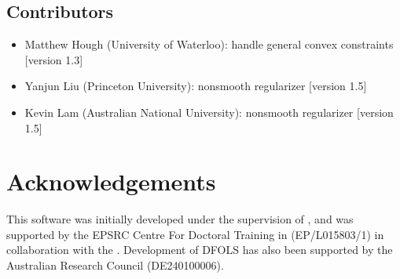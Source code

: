 \documentclass[letterpaper,10pt,english]{sphinxmanual}
\begin{document}
\section{Contributors}
\label{\detokenize{contributors:id1}}\begin{itemize}
\item {} 
\sphinxAtStartPar
Matthew Hough (University of Waterloo): handle general convex constraints {[}version 1.3{]}

\item {} 
\sphinxAtStartPar
Yanjun Liu (Princeton University): nonsmooth regularizer {[}version 1.5{]}

\item {} 
\sphinxAtStartPar
Kevin Lam (Australian National University): nonsmooth regularizer {[}version 1.5{]}

\end{itemize}


\chapter{Acknowledgements}
\label{\detokenize{index:acknowledgements}}
\sphinxAtStartPar
This software was initially developed under the supervision of , and was supported by the EPSRC Centre For Doctoral Training in  (EP/L015803/1) in collaboration with the . Development of DFO\sphinxhyphen{}LS has also been supported by the Australian Research Council (DE240100006).
\end{document}
